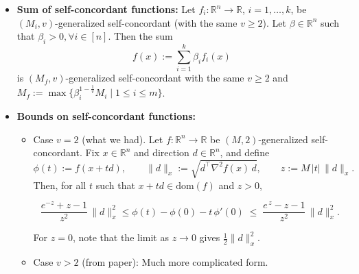 \documentclass[11pt]{article}
\theoremstyle{definition}
\theoremstyle{remark}
\theoremstyle{plain}
\theoremstyle{definition}
\newcommand{\R}{\mathbb{R}}
\newcommand{\1}{\mathbf{1}}
\renewcommand{\R}{\mathbb{R}}
\begin{document}
\begin{itemize}
    \item \textbf{Sum of self-concordant functions:} Let \(f_i:\mathbb{R}^n\to\mathbb{R}\), \(i=1,\dots,k\), be
\((M_i,v)\)-generalized self-concordant (with the same \(v\ge 2\)). Let $\beta\in \R^n$ such that $\beta_i>0, \forall i \in [n]$.
Then the sum
\[
f(x) := \sum_{i=1}^k \beta_if_i(x)
\]
is $(M_f,v)$-generalized self-concordant with the same $v\geq 2$ and $M_f:= \max\{\beta_i^{1-\frac{1}{v}}M_i \;|\; 1\leq i \leq m\}$.

\item \textbf{Bounds on self-concordant functions:} \begin{itemize}
    \item  Case $v=2$ {\color{red} (what we had)}. Let \(f:\mathbb{R}^n\to\mathbb{R}\) be \((M,2)\)-generalized self-concordant.
Fix \(x\in\mathbb{R}^n\) and direction \(d\in\mathbb{R}^n\), and define
\[
\phi(t) := f(x + t d), 
\qquad
\|d\|_x := \sqrt{d^\top \nabla^2 f(x)\, d},
\qquad
z := M\,|t|\,\|d\|_x.
\]
Then, for all \(t\) such that \(x + t d \in \mathrm{dom}(f)\) and \(z>0\),

\begin{equation}
\label{eq:GSC_exp_bounds}
    \frac{e^{-z} + z - 1}{z^2}\,\|d\|_x^2 \leq \phi(t) - \phi(0) - t\,\phi'(0)
\;\le\;
\frac{e^{\,z} - z - 1}{z^2}\,\|d\|_x^2.
\end{equation}

For \(z=0\), note that the limit as \(z\to 0\) gives
\(\tfrac{1}{2}\|d\|_x^2\).

\item Case $v>2$ {\color{red} (from paper): Much more complicated form}. 


\end{itemize}
\end{itemize}
\end{document}

